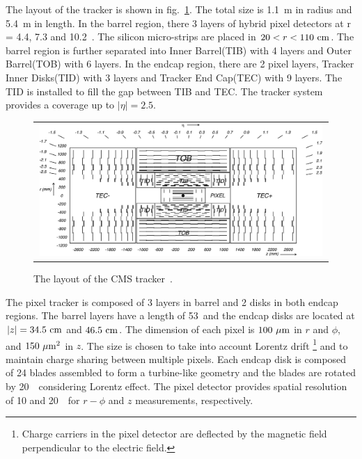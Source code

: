 The layout of the tracker is shown in fig.~\ref{fig:trackerlayout}. 
The total size is 1.1~m in radius and 5.4~m in length. 
In the barrel region, there 3 layers of hybrid pixel detectors
at r = 4.4, 7.3 and 10.2~\cm. The silicon micro-strips are 
placed in $20<r<110~\mathrm{cm}$. The barrel region is further separated 
into Inner Barrel(TIB) with 4 layers and Outer Barrel(TOB) with 6 layers. 
In the endcap region, there are 2 pixel layers, Tracker Inner Disks(TID)
with 3 layers and Tracker End Cap(TEC) with 9 layers. 
The TID is installed to fill the gap between TIB and TEC.
The tracker system provides a coverage up to $|\eta| = 2.5$.
%
\begin{figure}[htp] 
\centering 
\begin{tabular}{c} 
\includegraphics[width=0.99\textwidth]{figures/trackerlayout.jpeg} 
\end{tabular} 
\caption{The layout of the CMS tracker~\cite{Anghel2009277}.} 
\label{fig:trackerlayout} 
\end{figure} 

The pixel tracker is composed of 3 layers in barrel and 2 disks in both 
endcap regions. The barrel layers have a length of 53~\cm and the 
endcap disks are located at $|z|=34.5~\mathrm{cm}$ and $46.5~\mathrm{cm}$. 
The dimension of each pixel is $100~\mu\mathrm{m}$ in $r$ and $\phi$, and $150~\mu\mathrm{m}^2$ in $z$.  
The size is chosen to take into account Lorentz drift  
\footnote{
Charge carriers in the pixel detector are deflected by the magnetic field perpendicular 
to the electric field. }
and to maintain charge sharing between multiple pixels. 
Each endcap disk is composed of 24 blades assembled to form 
a turbine-like geometry and the blades are rotated by 20~\dg\
considering Lorentz effect. The pixel detector provides 
spatial resolution of 10 and 20~\um\ for $r-\phi$ and $z$ measurements, 
respectively.

